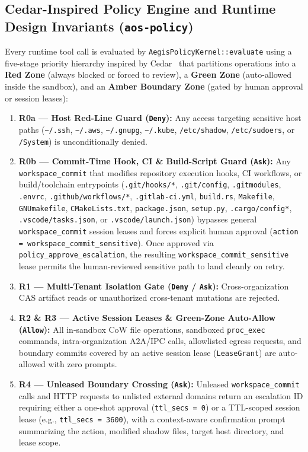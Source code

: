 \documentclass[10pt,twocolumn]{article}
\begin{document}
\subsection{Cedar-Inspired Policy Engine and Runtime Design Invariants (\texttt{aos-policy})}
\label{sec:policy}

Every runtime tool call is evaluated by \texttt{AegisPolicyKernel::\allowbreak evaluate} using a five-stage priority hierarchy inspired by Cedar~\cite{cutler2024cedar} that partitions operations into a \textbf{Red Zone} (always blocked or forced to review), a \textbf{Green Zone} (auto-allowed inside the sandbox), and an \textbf{Amber Boundary Zone} (gated by human approval or session leases):
\begin{enumerate}
    \item \textbf{R0a --- Host Red-Line Guard (\texttt{Deny}):} Any access targeting sensitive host paths (\texttt{\textasciitilde/.ssh}, \texttt{\textasciitilde/.aws}, \texttt{\textasciitilde/.gnupg}, \texttt{\textasciitilde/.kube}, \texttt{/etc/shadow}, \texttt{/etc/sudoers}, or \texttt{/System}) is unconditionally denied.
    \item \textbf{R0b --- Commit-Time Hook, CI \& Build-Script Guard (\texttt{Ask}):} Any \texttt{workspace\_commit} that modifies repository execution hooks, CI workflows, or build/toolchain entrypoints (\texttt{.git/hooks/*}, \texttt{.git/config}, \texttt{.gitmodules}, \texttt{.envrc}, \texttt{.github/workflows/*}, \texttt{.gitlab-ci.yml}, \texttt{build.rs}, \texttt{Makefile}, \texttt{GNUmakefile}, \texttt{CMakeLists.txt}, \texttt{package.json}, \texttt{setup.py}, \texttt{.cargo/config*}, \texttt{.vscode/tasks.json}, or \texttt{.vscode/launch.json}) bypasses general \texttt{workspace\_commit} session leases and forces explicit human approval (\texttt{action = workspace\_commit\_sensitive}). Once approved via \texttt{policy\_approve\_escalation}, the resulting \texttt{workspace\_commit\_sensitive} lease permits the human-reviewed sensitive path to land cleanly on retry.
    \item \textbf{R1 --- Multi-Tenant Isolation Gate (\texttt{Deny} / \texttt{Ask}):} Cross-organization CAS artifact reads or unauthorized cross-tenant mutations are rejected.
    \item \textbf{R2 \& R3 --- Active Session Leases \& Green-Zone Auto-Allow (\texttt{Allow}):} All in-sandbox CoW file operations, sandboxed \texttt{proc\_exec} commands, intra-organization A2A/IPC calls, allowlisted egress requests, and boundary commits covered by an active session lease (\texttt{LeaseGrant}) are auto-allowed with zero prompts.
    \item \textbf{R4 --- Unleased Boundary Crossing (\texttt{Ask}):} Unleased \texttt{workspace\_commit} calls and HTTP requests to unlisted external domains return an escalation ID requiring either a one-shot approval (\texttt{ttl\_secs = 0}) or a TTL-scoped session lease (e.g., \texttt{ttl\_secs = 3600}), with a context-aware confirmation prompt summarizing the action, modified shadow files, target host directory, and lease scope.
\end{enumerate}
\end{document}
